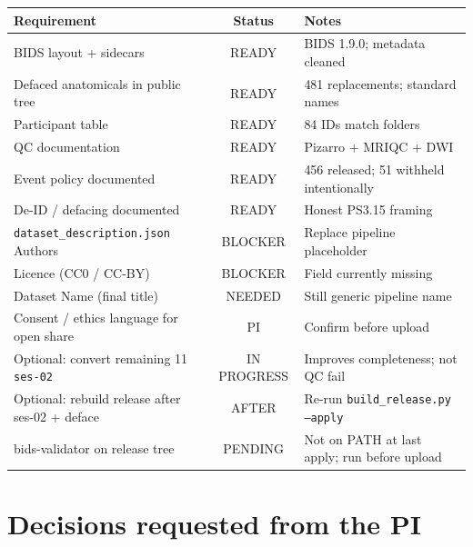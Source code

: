 \documentclass[11pt,a4paper]{article}
\begin{document}
\begin{center}
\begin{tabularx}{\textwidth}{@{}l c Y@{}}
\toprule
\textbf{Requirement} & \textbf{Status} & \textbf{Notes} \\
\midrule
BIDS layout + sidecars & \textcolor{ok}{READY} & BIDS 1.9.0; metadata cleaned \\
Defaced anatomicals in public tree & \textcolor{ok}{READY} & 481 replacements; standard names \\
Participant table & \textcolor{ok}{READY} & 84 IDs match folders \\
QC documentation & \textcolor{ok}{READY} & Pizarro + MRIQC + DWI \\
Event policy documented & \textcolor{ok}{READY} & 456 released; 51 withheld intentionally \\
De-ID / defacing documented & \textcolor{ok}{READY} & Honest PS3.15 framing \\
\texttt{dataset\_description.json} Authors & \textcolor{fail}{BLOCKER} & Replace pipeline placeholder \\
Licence (CC0 / CC-BY) & \textcolor{fail}{BLOCKER} & Field currently missing \\
Dataset Name (final title) & \textcolor{warn}{NEEDED} & Still generic pipeline name \\
Consent / ethics language for open share & \textcolor{warn}{PI} & Confirm before upload \\
Optional: convert remaining 11 \texttt{ses-02} & \textcolor{warn}{IN PROGRESS} & Improves completeness; not QC fail \\
Optional: rebuild release after ses-02 + deface & \textcolor{warn}{AFTER} & Re-run \texttt{build\_release.py --apply} \\
bids-validator on release tree & \textcolor{warn}{PENDING} & Not on PATH at last apply; run before upload \\
\bottomrule
\end{tabularx}
\end{center}

\section{Decisions requested from the PI}
\end{document}
